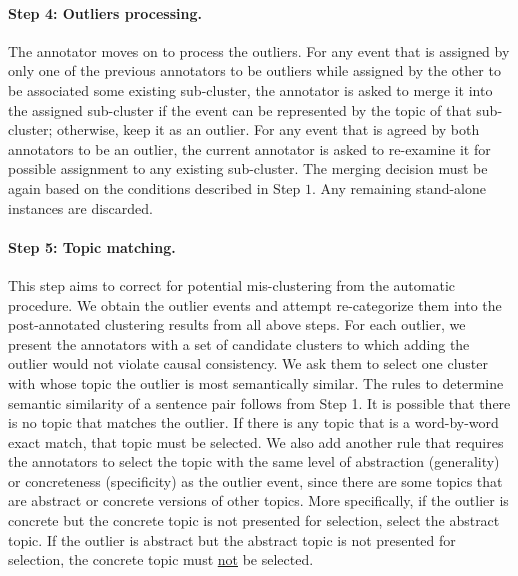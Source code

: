 \paragraph{Step 4: Outliers processing.}
The annotator moves on to process the outliers. For any event that is assigned by only one of the previous annotators to be outliers while assigned by the other to be associated some existing sub-cluster, the annotator is asked to merge it into the assigned sub-cluster if the event can be represented by the topic of that sub-cluster; otherwise, keep it as an outlier. For any event that is agreed by both annotators to be an outlier, the current annotator is asked to re-examine it for possible assignment to any existing sub-cluster. The merging decision must be again based on the conditions described in Step $1$. Any remaining stand-alone instances are discarded. 

\paragraph{Step 5: Topic matching.} This step aims to correct for potential mis-clustering from the automatic procedure. We obtain the outlier events and attempt re-categorize them into the post-annotated clustering results from all above steps. For each outlier, we present the annotators with a set of candidate clusters to which adding the outlier would not violate causal consistency. We ask them to select one cluster with whose topic the outlier is most semantically similar. The rules to determine semantic similarity of a sentence pair follows from Step 1. It is possible that there is no topic that matches the outlier. If there is any topic that is a word-by-word exact match, that topic must be selected. We also add another rule that requires the annotators to select the topic with the same level of abstraction (generality) or concreteness (specificity) as the outlier event, since there are some topics that are abstract or concrete versions of other topics. More specifically, if the outlier is concrete but the concrete topic is not presented for selection, select the abstract topic. If the outlier is abstract but the abstract topic is not presented for selection, the concrete topic must \underline{not} be selected. 

